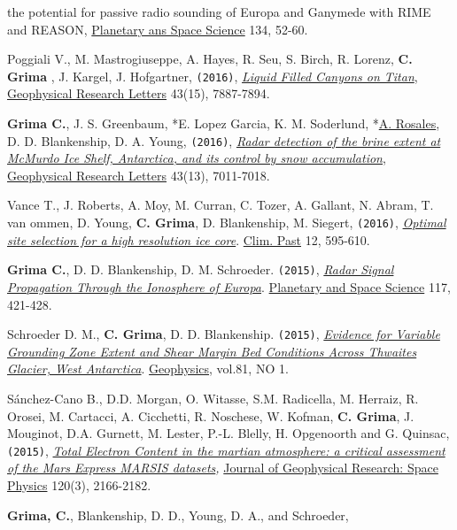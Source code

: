 \begin{etaremune}
{{  the potential for passive radio sounding of Europa and Ganymede with
  RIME and REASON}}, \ul{Planetary ans Space Science} 134,  52-60.
\item
  Poggiali V., M. Mastrogiuseppe, A. Hayes, R. Seu, S. Birch, R. Lorenz,
  \textbf{C. Grima }, J. Kargel, J. Hofgartner, \texttt{(2016)},
  \href{http://onlinelibrary.wiley.com/doi/10.1002/2016GL069679/abstract}{\emph{Liquid
  Filled Canyons on Titan}}, \ul{Geophysical Research Letters} 43(15), 7887-7894.
\item
  \textbf{Grima C.}, J. S. Greenbaum, *E. Lopez Garcia, K.
  M. Soderlund, *\ul{A. Rosales}, D. D. Blankenship, D. A. Young,
  \texttt{(2016)},
  \href{http://onlinelibrary.wiley.com/doi/10.1002/2016GL069524/pdf}{\emph{Radar
  detection of the brine extent at McMurdo Ice Shelf, Antarctica, and
  its control by snow accumulation}}, \ul{Geophysical Research Letters} 43(13), 7011-7018.
\item
  Vance T., J. Roberts, A. Moy, M. Curran, C. Tozer, A. Gallant, N.
  Abram, T. van ommen, D. Young, \textbf{C. Grima}, D. Blankenship, M.
  Siegert, \texttt{(2016)},
  \href{http://www.clim-past.net/12/595/2016/cp-12-595-2016.pdf}{\emph{Optimal
  site selection for a high resolution ice core}}. \ul{Clim. Past} 12,
  595-610.
\item
  \textbf{Grima C.}, D. D. Blankenship, D. M. Schroeder. \texttt{(2015)},
  \emph{\href{http://www.sciencedirect.com/science/article/pii/S0032063315002470}{Radar
  Signal Propagation Through the Ionosphere of Europa}}. \ul{Planetary and
  Space Science} 117, 421-428.
\item
  Schroeder D. M., \textbf{C. Grima}, D. D. Blankenship. \texttt{(2015)},
  \emph{\href{http://library.seg.org/doi/abs/10.1190/geo2015-0122.1}{Evidence
  for Variable Grounding Zone Extent and Shear Margin Bed Conditions
  Across Thwaites Glacier, West Antarctica}}. \ul{Geophysics}, vol.81, NO 1.
\item
  Sánchez-Cano B., D.D. Morgan, O. Witasse, S.M. Radicella, M. Herraiz,
  R. Orosei, M. Cartacci, A. Cicchetti, R. Noschese, W. Kofman,
  \textbf{C. Grima}, J. Mouginot, D.A. Gurnett, M. Lester, P.-L. Blelly,
  H. Opgenoorth and G. Quinsac, \texttt{(2015)},
  \emph{\href{http://onlinelibrary.wiley.com/doi/10.1002/2014JA020630/abstract}{Total
  Electron Content in the martian atmosphere: a critical assessment of
  the Mars Express MARSIS datasets},} \ul{Journal of Geophysical Research:
  Space Physics} 120(3), 2166-2182.
\item
  \textbf{Grima, C.}, Blankenship, D. D., Young, D. A., and Schroeder,

\end{etaremune}
